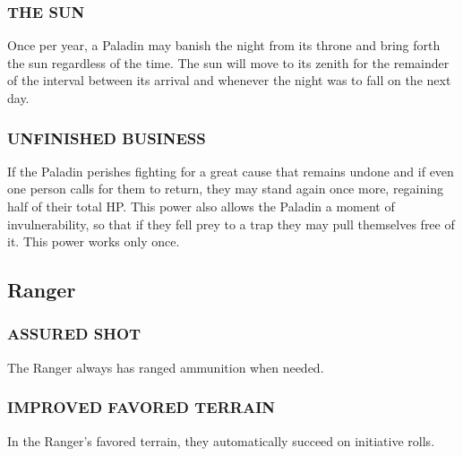 \documentclass[twoside]{article}
\begin{document}
\subsubsection*{\footnotesize{T}\scriptsize{HE} \footnotesize{S}\scriptsize{UN}\normalsize}

Once per year, a Paladin may banish the night from its throne and bring forth the sun regardless of the time. The sun will move to its zenith for the remainder of the interval between its arrival and whenever the night was to fall on the next day.

\subsubsection*{\footnotesize{U}\scriptsize{NFINISHED} \footnotesize{B}\scriptsize{USINESS}\normalsize}

If the Paladin perishes fighting for a great cause that remains undone and if even one person calls for them to return, they may stand again once more, regaining half of their total HP. This power also allows the Paladin a moment of invulnerability, so that if they fell prey to a trap they may pull themselves free of it. This power works only once.

\subsection*{Ranger}

\subsubsection*{\footnotesize{A}\scriptsize{SSURED} \footnotesize{S}\scriptsize{HOT}\normalsize}

The Ranger always has ranged ammunition when needed.

\subsubsection*{\footnotesize{I}\scriptsize{MPROVED} \footnotesize{F}\scriptsize{AVORED} \footnotesize{T}\scriptsize{ERRAIN}\normalsize}

In the Ranger's favored terrain, they automatically succeed on initiative rolls.
\end{document}
